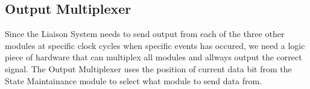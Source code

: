 \subsection{Output Multiplexer}
Since the Liaison System needs to send output from each of the three other modules at specific clock cycles when specific events has occured, we need
a logic piece of hardware that can multiplex all modules and allways output the correct signal. The Output Multiplexer uses the position of current data bit
from the State Maintainance module to select what module to send data from.
